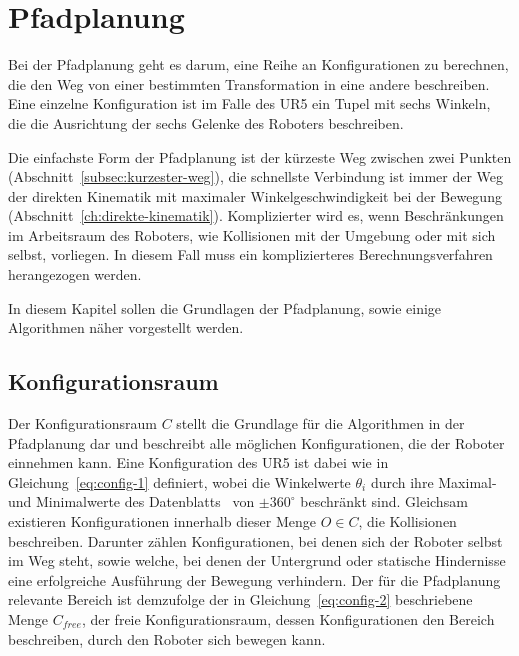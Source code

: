 \cleardoublepage


\chapter{Pfadplanung}\label{ch:pfadplanung}

Bei der Pfadplanung geht es darum, eine Reihe an Konfigurationen zu berechnen, die den Weg von einer bestimmten Transformation in eine andere beschreiben.
Eine einzelne Konfiguration ist im Falle des UR5 ein Tupel mit sechs Winkeln, die die Ausrichtung der sechs Gelenke des Roboters beschreiben.

Die einfachste Form der Pfadplanung ist der kürzeste Weg zwischen zwei Punkten (Abschnitt~\ref{subsec:kurzester-weg}), die schnellste Verbindung ist immer der Weg der direkten Kinematik mit maximaler Winkelgeschwindigkeit bei der Bewegung (Abschnitt~\ref{ch:direkte-kinematik}).
Komplizierter wird es, wenn Beschränkungen im Arbeitsraum des Roboters, wie Kollisionen mit der Umgebung oder mit sich selbst, vorliegen.
In diesem Fall muss ein komplizierteres Berechnungsverfahren herangezogen werden.

In diesem Kapitel sollen die Grundlagen der Pfadplanung, sowie einige Algorithmen näher vorgestellt werden.


\section{Konfigurationsraum}\label{sec:konfigurationsraum}


Der Konfigurationsraum $\mathit{C}$ stellt die Grundlage für die Algorithmen in der Pfadplanung dar und beschreibt alle möglichen Konfigurationen, die der Roboter einnehmen kann.
Eine Konfiguration des UR5 ist dabei wie in Gleichung~\ref{eq:config-1} definiert, wobei die Winkelwerte $\theta_i$ durch ihre Maximal- und Minimalwerte des Datenblatts~\cite{universalrobotsUR5TechnicalSpecifications} von $\pm 360^{\circ}$ beschränkt sind.
Gleichsam existieren Konfigurationen innerhalb dieser Menge $\mathit{O}\in\mathit{C}$, die Kollisionen beschreiben.
Darunter zählen Konfigurationen, bei denen sich der Roboter selbst im Weg steht, sowie welche, bei denen der Untergrund oder statische Hindernisse eine erfolgreiche Ausführung der Bewegung verhindern.
Der für die Pfadplanung relevante Bereich ist demzufolge der in Gleichung~\ref{eq:config-2} beschriebene Menge $\mathit{C}_{free}$, der freie Konfigurationsraum, dessen Konfigurationen den Bereich beschreiben, durch den Roboter sich bewegen kann.

